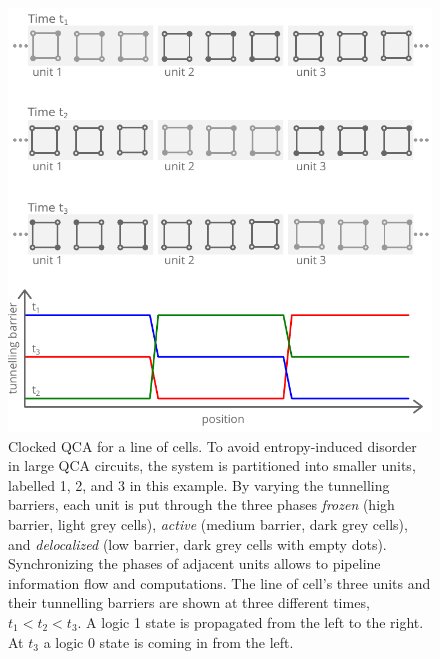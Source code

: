 \begin{figure}
  \center
  \includegraphics{clocking}
  \caption{
Clocked QCA for a line of cells. To avoid entropy-induced disorder in large QCA
circuits, the system is partitioned into smaller units, labelled 1, 2, and 3 in
this example. By varying the tunnelling barriers, each unit is put through the
three phases \emph{frozen} (high barrier, light grey cells), \emph{active}
(medium barrier, dark grey cells), and \emph{delocalized} (low barrier, dark
grey cells with empty dots). Synchronizing the phases of adjacent units allows
to pipeline information flow and computations. The line of cell's three units
and their tunnelling barriers are shown at three different times, $t_1<t_2<t_3$.
A logic 1 state is propagated from the left to the right. At $t_3$ a logic 0
state is coming in from the left.
}
  \label{fig:clocking}
\end{figure}

